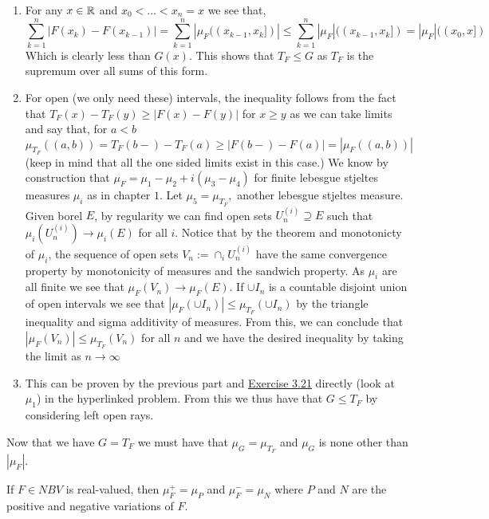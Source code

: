 \documentclass[12pt,a4paper]{article}
\begin{document}
\begin{solution}
\begin{enumerate}[label=\alph*.]
    \item For any $x\in\mathbb{R}$ and $x_0<\ldots<x_n=x$ we see that,
        \[
            \sum_{k=1}^n|F(x_k)-F(x_{k-1})|=\sum_{k=1}^n|\mu_F((x_{k-1},x_k])|\leq\sum_{k=1}^n|\mu_F|((x_{k-1},x_k])=|\mu_F|((x_0,x])
        \]
       Which is clearly less than $G(x).$ 
       This shows that $T_F\leq G$ as $T_F$ is the supremum over all sums of this form.
   \item For open (we only need these) intervals, the inequality follows from the fact that $T_F(x)-T_F(y)\geq|F(x)-F(y)|$ for $x\geq y$ as we can take limits and say that, for $a<b$
       \[
           \mu_{T_F}((a,b))=T_F(b-)-T_F(a)\geq|F(b-)-F(a)|=|\mu_F((a,b))|
       \]
       (keep in mind that all the one sided limits exist in this case.) 
       We know by construction that $\mu_F=\mu_1-\mu_2+i(\mu_3-\mu_4)$ for finite lebesgue stjeltes measures $\mu_i$ as in chapter $1.$ 
       Let $\mu_5=\mu_{T_F},$ another lebesgue stjeltes measure. 
       Given borel $E$, by  regularity we can find open sets $U_n^{(i)}\supseteq E$ such that $\mu_i(U_n^{(i)})\to\mu_i(E)$ for all $i$. 
       Notice that by the  theorem and monotonicty of $\mu_i$, the sequence of open sets $V_n:=\cap_i U_n^{(i)}$ have the same convergence property by monotonicity of measures and the sandwich property. 
       As $\mu_i$ are all finite we see that $\mu_F(V_n)\to\mu_F(E).$ 
       If $\cup I_n$ is a countable disjoint union of open intervals we see that $|\mu_F(\cup I_n)|\leq\mu_{T_F}(\cup I_n)$ by the triangle inequality and sigma additivity of measures.
       From this, we can conclude that $|\mu_F(V_n)|\leq\mu_{T_F}(V_n)$ for all $n$ and we have the desired inequality by taking the limit as $n\to\infty$
   \item This can be proven by  the previous part and \hyperref[prob:3-21]{Exercise 3.21} directly (look at $\mu_1$) in the hyperlinked problem. 
       From this we thus have that $G\leq T_F$ by considering left open rays.
\end{enumerate}
Now that we have $G=T_F$ we must have that $\mu_G=\mu_{T_F}$ and $\mu_G$ is none other than $|\mu_F|.$
\end{solution}
\begin{problem}\label{prob:3-29}
If $F\in NBV$ is real-valued, then $\mu_{F}^{+}=\mu_{P}$ and $\mu_{F}^{-}=\mu_{N}$ where $P$ and $N$ are the positive and negative variations of $F$.
\end{problem}
\end{document}
